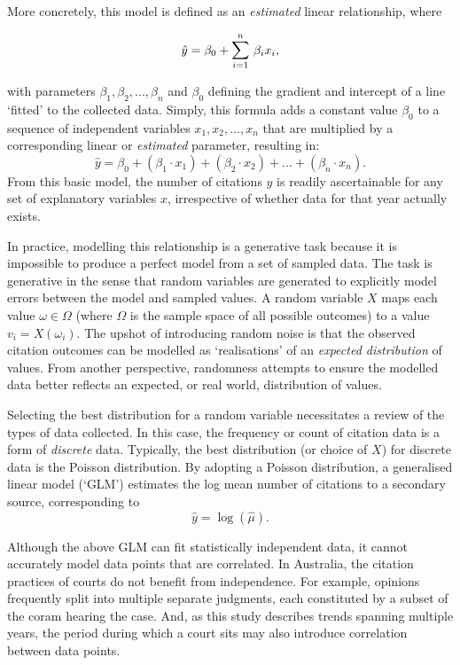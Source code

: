 More concretely, this model is defined as an \textit{estimated} linear relationship, where 

\begin{equation*}
\hat{y} = \beta_0 + \mathlarger{\sum}_{i=1}^{n} \ \beta_ix_i,
\end{equation*}

with parameters $\beta_1, \beta_2, ..., \beta_n$ and $\beta_0$ defining the gradient and intercept of a line `fitted' to the collected data. Simply, this formula adds a constant value $\beta_0$ to a sequence of independent variables $x_1, x_2, ..., x_n$ that are multiplied by a corresponding linear or \textit{estimated} parameter, resulting in: \[\hat{y} = \beta_0 + (\beta_1 \cdot x_1) + (\beta_2 \cdot x_2) + ... + (\beta_n \cdot x_n).\] From this basic model, the number of citations $y$ is readily ascertainable for any set of explanatory variables $x$, irrespective of whether data for that year actually exists.

In practice, modelling this relationship is a generative task because it is impossible to produce a perfect model from a set of sampled data. The task is generative in the sense that random variables are generated to explicitly model errors between the model and sampled values. A random variable $X$ maps each value $\omega \in \Omega$ (where $\Omega$ is the sample space of all possible outcomes) to a value $v_i = X(\omega_i)$. The upshot of introducing random noise is that the observed citation outcomes can be modelled as `realisations' of an \textit{expected distribution} of values. From another perspective, randomness attempts to ensure the modelled data better reflects an expected, or real world, distribution of values.

Selecting the best distribution for a random variable necessitates a review of the types of data collected. In this case, the frequency or count of citation data is a form of \textit{discrete} data. Typically, the best distribution (or choice of $X$) for discrete data is the Poisson distribution. By adopting a Poisson distribution, a generalised linear model (`GLM') estimates the log mean number of citations to a secondary source, corresponding to \[\hat{y} = \log(\hat{\mu}).\]

Although the above GLM can fit statistically independent data, it cannot accurately model data points that are correlated. In Australia, the citation practices of courts do not benefit from independence. For example, opinions frequently split into multiple separate judgments, each constituted by a subset of the coram hearing the case. And, as this study describes trends spanning multiple years, the period during which a court sits may also introduce correlation between data points.

